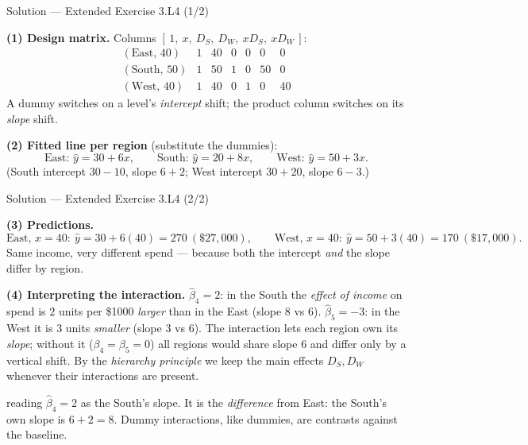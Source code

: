 \documentclass[aspectratio=169,11pt]{beamer}
\begin{document}
\begin{frame}{Solution --- Extended Exercise 3.L4 (1/2)}
  \begin{solutionbox}
    \textbf{(1) Design matrix.} Columns
    $[\,1,\ x,\ D_S,\ D_W,\ xD_S,\ xD_W\,]$:
    \[
      \begin{array}{l|cccccc}
        (\text{East},\,40)  & 1 & 40 & 0 & 0 & 0  & 0\\
        (\text{South},\,50) & 1 & 50 & 1 & 0 & 50 & 0\\
        (\text{West},\,40)  & 1 & 40 & 0 & 1 & 0  & 40
      \end{array}
    \]
    A dummy switches on a level's \emph{intercept} shift; the product
    column switches on its \emph{slope} shift.

    \textbf{(2) Fitted line per region} (substitute the dummies):
    \[
      \text{East: } \hat y = 30 + 6x,\qquad
      \text{South: } \hat y = 20 + 8x,\qquad
      \text{West: } \hat y = 50 + 3x.
    \]
    (South intercept $30-10$, slope $6+2$; West intercept $30+20$,
    slope $6-3$.)
  \end{solutionbox}
\end{frame}

\begin{frame}{Solution --- Extended Exercise 3.L4 (2/2)}
  \begin{solutionbox}
    \textbf{(3) Predictions.}
    \[
      \text{East, } x{=}40:\ \hat y = 30+6(40)=270\ (\$27{,}000),\qquad
      \text{West, } x{=}40:\ \hat y = 50+3(40)=170\ (\$17{,}000).
    \]
    Same income, very different spend --- because both the intercept
    \emph{and} the slope differ by region.

    \textbf{(4) Interpreting the interaction.} $\hat\beta_4=2$: in the
    South the \emph{effect of income} on spend is $2$ units per \$1000
    \emph{larger} than in the East (slope $8$ vs $6$). $\hat\beta_5=-3$:
    in the West it is $3$ units \emph{smaller} (slope $3$ vs $6$). The
    interaction lets each region own its \emph{slope}; without it
    ($\beta_4=\beta_5=0$) all regions would share slope $6$ and differ
    only by a vertical shift. By the \emph{hierarchy principle} we keep
    the main effects $D_S,D_W$ whenever their interactions are present.
  \end{solutionbox}
  \begin{mistake}
    reading $\hat\beta_4=2$ as the South's
    slope. It is the \emph{difference} from East: the South's own slope
    is $6+2=8$. Dummy interactions, like dummies, are contrasts against
    the baseline.
  \end{mistake}
\end{frame}
\end{document}
